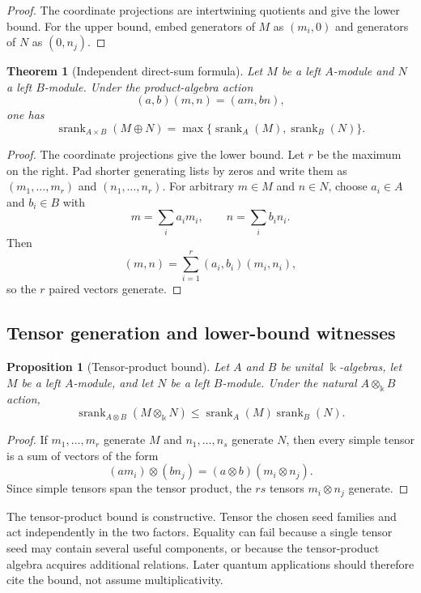 \documentclass[11pt]{article}
\newtheorem{theorem}{Theorem}[section]
\newtheorem{proposition}[proposition]{Proposition}
\theoremstyle{definition}
\theoremstyle{remark}
\theoremstyle{definition}\newtheorem{example}[theorem]{Example}
\newcommand{\bbk}{\Bbbk}
\newcommand{\srank}{\operatorname{srank}}
\newcommand{\RecordID}[1]{\label{record:#1}}
\newcommand{\Depends}[1]{}
\begin{document}
\begin{proof}
The coordinate projections are intertwining quotients and give the lower bound.  For the upper bound, embed generators of $M$ as $(m_i,0)$ and generators of $N$ as $(0,n_j)$.
\end{proof}

\begin{theorem}[Independent direct-sum formula]
\label{thm:independent-direct-sum}
Let $M$ be a left $A$-module and $N$ a left $B$-module.  Under the product-algebra action
\[
(a,b)(m,n)=(am,bn),
\]
one has
\[
\boxed{
\srank_{A\times B}(M\oplus N)
=
\max\{\srank_A(M),\srank_B(N)\}.
}
\]
\end{theorem}
\RecordID{PSC-I-T-INDEPENDENT-DIRECT-SUM}
\Depends{PSC-I-T-QUOTIENT-MONOTONICITY.}

\begin{proof}
The coordinate projections give the lower bound.  Let $r$ be the maximum on the right.  Pad shorter generating lists by zeros and write them as $(m_1,\ldots,m_r)$ and $(n_1,\ldots,n_r)$.  For arbitrary $m\in M$ and $n\in N$, choose $a_i\in A$ and $b_i\in B$ with
\[
m=\sum_ia_im_i,
\qquad
n=\sum_ib_in_i.
\]
Then
\[
(m,n)=\sum_{i=1}^r(a_i,b_i)(m_i,n_i),
\]
so the $r$ paired vectors generate.
\end{proof}

\subsection{Tensor generation and lower-bound witnesses}
\begin{proposition}[Tensor-product bound]
\label{prop:tensor-bound}
Let $A$ and $B$ be unital $\bbk$-algebras, let $M$ be a left $A$-module, and let $N$ be a left $B$-module.  Under the natural $A\otimes_{\bbk}B$ action,
\[
\boxed{
\srank_{A\otimes B}(M\otimes_{\bbk}N)
\leq
\srank_A(M)\srank_B(N).
}
\]
\end{proposition}
\RecordID{PSC-I-P-TENSOR-BOUND}
\Depends{PSC-I-D-SEED-RANK.}

\begin{proof}
If $m_1,\ldots,m_r$ generate $M$ and $n_1,\ldots,n_s$ generate $N$, then every simple tensor is a sum of vectors of the form
\[
(am_i)\otimes(bn_j)=(a\otimes b)(m_i\otimes n_j).
\]
Since simple tensors span the tensor product, the $rs$ tensors $m_i\otimes n_j$ generate.
\end{proof}

\begin{interpretation}
The tensor-product bound is constructive.  Tensor the chosen seed families and act independently in the two factors.  Equality can fail because a single tensor seed may contain several useful components, or because the tensor-product algebra acquires additional relations.  Later quantum applications should therefore cite the bound, not assume multiplicativity.
\end{interpretation}
\end{document}
